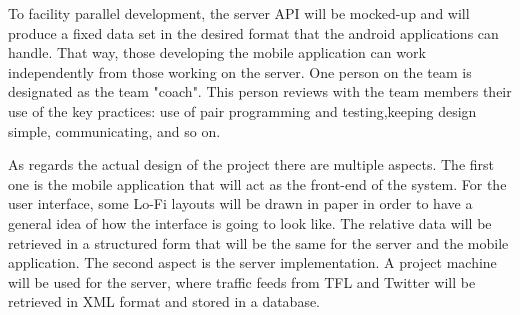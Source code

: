 To facility parallel development, the server API will be mocked-up and will produce a fixed data set in the desired format that the android applications can handle. That way, those developing the mobile application can work independently from those working on the server. One person on the team is designated as the team "coach". This person reviews with the team members their use of the key practices: use of pair programming and testing,keeping design simple, communicating, and so on.

As regards the actual design of the project there are multiple aspects. The first one is the mobile application that will act as the front-end of the system. For the user interface, some Lo-Fi layouts will be drawn in paper in order to have a general idea of how the interface is going to look like. The relative data will be retrieved in a structured form that will be the same for the server and the mobile application. The second aspect is the server implementation. A project machine will be used for the server, where traffic feeds from TFL and Twitter will be retrieved in XML format and stored in a database.
